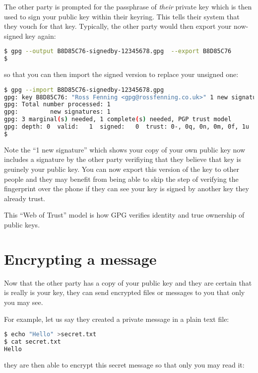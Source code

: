 \documentclass{report}
\begin{document}
The other party is prompted for the passphrase of \emph{their} private key
which is then used to sign your public key within their keyring. This
tells their system that they vouch for that key. Typically, the other
party would then export your now-signed key again:

\begin{lstlisting}[language=bash]
$ gpg --output B8D85C76-signedby-12345678.gpg  --export B8D85C76
$
\end{lstlisting}

\noindent so that you can then import the signed version to replace your
unsigned one:

\begin{lstlisting}[language=bash]
$ gpg --import B8D85C76-signedby-12345678.gpg
gpg: key B8D85C76: "Ross Fenning <gpg@rossfenning.co.uk>" 1 new signature
gpg: Total number processed: 1
gpg:         new signatures: 1
gpg: 3 marginal(s) needed, 1 complete(s) needed, PGP trust model
gpg: depth: 0  valid:   1  signed:   0  trust: 0-, 0q, 0n, 0m, 0f, 1u
$
\end{lstlisting}

Note the ``1 new signature'' which shows your copy of your own public key
now includes a signature by the other party verifiying that they
believe that key is geuinely your public key. You can now export this
version of the key to other people and they may benefit from being able
to skip the step of verifying the fingerprint over the phone if they
can see your key is signed by another key they already trust.

This ``Web of Trust'' model is how GPG verifies identity and true ownership
of public keys.

\section{Encrypting a message}

Now that the other party has a copy of your public key and they are certain
that is really is your key, they can send encrypted files or messages to
you that only you may see.

For example, let us say they created a private message in a plain text file:

\begin{lstlisting}[language=bash]
$ echo "Hello" >secret.txt
$ cat secret.txt 
Hello
\end{lstlisting}

they are then able to encrypt this secret message so that only you may read it:
\end{document}
